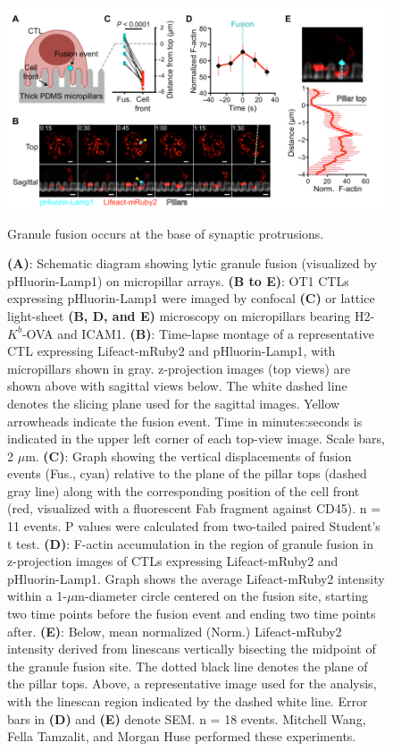 \begin{figure}[htbp]
	\centering
	\includegraphics[width=\textwidth]{../figures/chapter2/fig2degranulation.png}
	\caption{Granule fusion occurs at the base of synaptic protrusions.}
	\caption*{\textbf{(A)}: Schematic diagram showing lytic granule fusion (visualized by pHluorin-Lamp1) on micropillar arrays. \textbf{(B to E)}: OT1 CTLs expressing pHluorin-Lamp1 were imaged by confocal \textbf{(C)} or lattice light-sheet \textbf{(B, D, and E)} microscopy on micropillars bearing H2-$K^{b}$-OVA and ICAM1. \textbf{(B)}: Time-lapse montage of a representative CTL expressing Lifeact-mRuby2 and pHluorin-Lamp1, with micropillars shown in gray. z-projection images (top views) are shown above with sagittal views below. The white dashed line denotes the slicing plane used for the sagittal images. Yellow arrowheads indicate the fusion event. Time in minutes:seconds is indicated in the upper left corner of each top-view image. Scale bars, 2 $\mu$m. \textbf{(C)}: Graph showing the vertical displacements of fusion events (Fus., cyan) relative to the plane of the pillar tops (dashed gray line) along with the corresponding position of the cell front (red, visualized with a fluorescent Fab fragment against CD45). n = 11 events. P values were calculated from two-tailed paired Student’s t test. \textbf{(D)}: F-actin accumulation in the region of granule fusion in z-projection images of CTLs expressing Lifeact-mRuby2 and pHluorin-Lamp1. Graph shows the average Lifeact-mRuby2 intensity within a 1-$\mu$m-diameter circle centered on the fusion site, starting two time points before the fusion event and ending two time points after. \textbf{(E)}: Below, mean normalized (Norm.) Lifeact-mRuby2 intensity derived from linescans vertically bisecting the midpoint of the granule fusion site. The dotted black line denotes the plane of the pillar tops. Above, a representative image used for the analysis, with the linescan region indicated by the dashed white line. Error bars in \textbf{(D)} and \textbf{(E)} denote SEM. n = 18 events. Mitchell Wang, Fella Tamzalit, and Morgan Huse performed these experiments.}
	\label{fig:fig2degranulation}
\end{figure}

